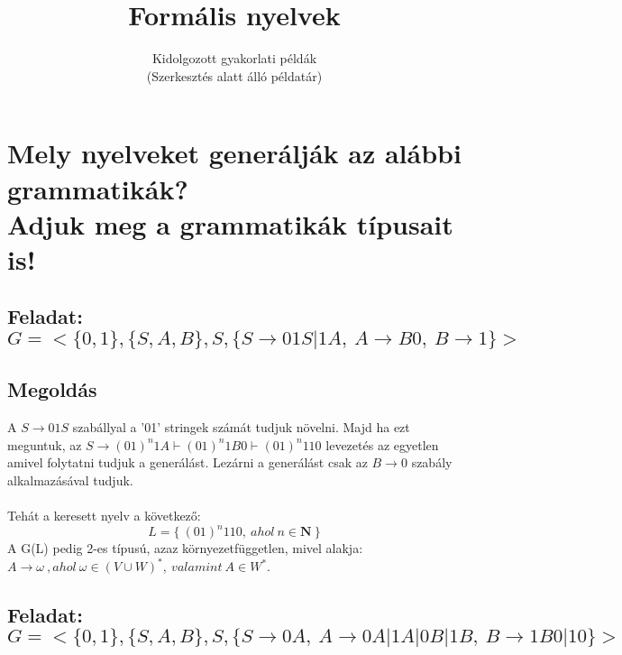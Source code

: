 \documentclass[12pt]{article}
\title{\textbf{Formális nyelvek}}
\author{Kidolgozott gyakorlati példák \\ (Szerkesztés alatt álló példatár)}
\date{}
\begin{document}
\maketitle

\section{Mely nyelveket generálják az alábbi grammatikák? \\ Adjuk meg a grammatikák típusait is!}


\subsection{Feladat: \\
$ G=< \{0,1\}, \{S,A,B\}, S, \{ S \rightarrow 01S|1A,\ A \rightarrow B0,\ B \rightarrow 1 \}> $}
\maketitle
\subsection{Megoldás}
A $ S \rightarrow 01S $ szabállyal a '01' stringek számát tudjuk növelni. Majd ha ezt meguntuk, 
az $ S \rightarrow (01)^n1A \vdash (01)^n1B0 \vdash (01)^n110 $ levezetés az egyetlen amivel folytatni tudjuk 
a generálást. Lezárni a generálást csak az $ B \rightarrow 0 $ szabály alkalmazásával tudjuk. \\\\
Tehát a keresett nyelv a következő:
$$ L = \{ \ (01)^n110, \ ahol \ n \in \mathbf{N}  \ \} $$
A G(L) pedig 2-es típusú, azaz környezetfüggetlen, mivel alakja: \\
$ A \rightarrow \omega \ , ahol \ \omega \in (V \cup W)^* , \ valamint \ A \in W^*. $

\subsection{Feladat: \\
$ G=< \{0,1\}, \{S,A,B\}, S, \{ S \rightarrow 0A,\ A \rightarrow 0A|1A|0B|1B,\ B \rightarrow 1B0|10 \}> $}
\maketitle
\end{document}
